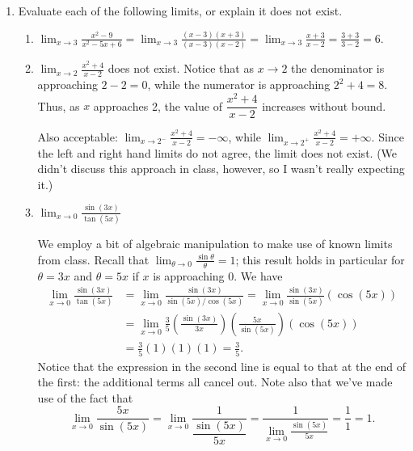 \documentclass[12pt]{article}
\newcommand{\di}{\displaystyle}
\begin{document}
\begin{enumerate}
\bigskip

\item Evaluate each of the following limits, or explain it does not exist.
\begin{enumerate}
 \item $\di \lim_{x\to 3}\frac{x^2-9}{x^2-5x+6} = \lim_{x\to 3}\frac{(x-3)(x+3)}{(x-3)(x-2)} = \lim_{x\to 3}\frac{x+3}{x-2} = \frac{3+3}{3-2} = 6.$

\vspace{0.5in}

 \item $\di \lim_{x\to 2}\frac{x^2+4}{x-2}$ does not exist. Notice that as $x\to 2$ the denominator is approaching $2-2=0$, while the numerator is approaching $2^2+4=8$. Thus, as $x$ approaches 2, the value of $\dfrac{x^2+4}{x-2}$ increases without bound.

\medskip

Also acceptable: $\di \lim_{x\to 2^-}\frac{x^2+4}{x-2} = -\infty$, while $\di \lim_{x\to 2^+}\frac{x^2+4}{x-2} = +\infty$. Since the left and right hand limits do not agree, the limit does not exist. (We didn't discuss this approach in class, however, so I wasn't really expecting it.)

\newpage

 \item $\di \lim_{x\to 0}\frac{\sin(3x)}{\tan(5x)}$

\medskip

We employ a bit of algebraic manipulation to make use of known limits from class. Recall that $\di\lim_{\theta\to 0}\frac{\sin\theta}{\theta} = 1$; this result holds in particular for $\theta = 3x$ and $\theta =5x$ if $x$ is approaching 0. We have
\begin{align*}
 \lim_{x\to 0}\frac{\sin(3x)}{\tan(5x)} & = \lim_{x\to 0}\frac{\sin(3x)}{\sin(5x)/\cos(5x)} = \lim_{x\to 0}\frac{\sin(3x)}{\sin(5x)}(\cos(5x))\\
 & = \lim_{x\to 0} \frac{3}{5}\left(\frac{\sin(3x)}{3x}\right)\left(\frac{5x}{\sin(5x)}\right)(\cos(5x))\\
 & = \frac{3}{5}(1)(1)(1) = \frac{3}{5}.
\end{align*}
Notice that the expression in the second line is equal to that at the end of the first: the additional terms all cancel out. Note also that we've made use of the fact that
\[
 \lim_{x\to 0}\frac{5x}{\sin(5x)} = \lim_{x\to 0}\frac{1}{\dfrac{\sin(5x)}{5x}} = \frac{1}{\di\lim_{x\to 0}\frac{\sin(5x)}{5x}} = \frac{1}{1}=1.
\]

\end{enumerate}


 \end{enumerate}
\end{document}
